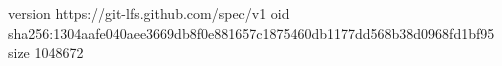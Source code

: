 version https://git-lfs.github.com/spec/v1
oid sha256:1304aafe040aee3669db8f0e881657c1875460db1177dd568b38d0968fd1bf95
size 1048672
